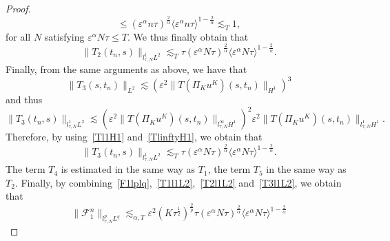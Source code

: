 \documentclass[10pt,a4paper]{article}
\begin{document}
\begin{proof}
\begin{equation}
      \leq {(\varepsilon^\alpha n\tau)}^\frac2\alpha {\langle\varepsilon^\alpha n\tau\rangle}^{1-\frac2\alpha} 
      \lesssim_T 1,
    \end{equation}
    for all \(N\) satisfying \( \varepsilon^\alpha N\tau \leq T \).
    We thus finally obtain that 
    \begin{equation}\label{T2l1L2}
      \|T_2(t_n,s)\|_{l^1_{\tau,N}L^2} \lesssim_T \tau 
      {(\varepsilon^\alpha N\tau)}^\frac2\alpha {\langle\varepsilon^\alpha N\tau\rangle}^{1-\frac2\alpha}.
    \end{equation}
    Finally, from the same arguments as above, we have that 
    \[ \|T_3(s,t_n)\|_{L^2}  \lesssim \left(\varepsilon^2\|T(\Pi_K u^K)(s, t_n) \|_{H^1}\right)^3 \]
    and thus 
    \[ \|T_3(t_n,s)\|_{l^1_{\tau,N}L^2} \lesssim \left(\varepsilon^2 
    \|T(\Pi_K u^K)(s,t_n)\|_{l^\infty_{\tau,N}H^1}\right)^2 \varepsilon^2 
    \|T(\Pi_K u^K)(s,t_n)\|_{l^1_{\tau,N}H^1}. \]
    Therefore, by using~\eqref{Tl1H1} and~\eqref{TlinftyH1}, we obtain that 
    \begin{equation}\label{T3l1L2}
      \|T_3(t_n,s)\|_{l^1_{\tau,N}L^2} \lesssim_T \tau 
      {(\varepsilon^\alpha N\tau)}^\frac2\alpha {\langle\varepsilon^\alpha N\tau\rangle}^{1-\frac2\alpha}.
    \end{equation}
    The term \(T_4\) is estimated in the same way as \(T_1\), the term \(T_5\)
    in the same way as \(T_2\). Finally, by combining~\eqref{F1lplq},~\eqref{T1l1L2},~\eqref{T2l1L2} 
    and~\eqref{T3l1L2}, we obtain that 
    \[ \| \mathcal F_1^n \|_{l^p_{\tau,N}L^q} \lesssim_{\alpha,T}
    \varepsilon^2 (K\tau^\frac12)^\frac2p \tau 
    {(\varepsilon^\alpha N\tau)}^\frac2\alpha {\langle\varepsilon^\alpha N\tau\rangle}^{1-\frac2\alpha}
    \]
  \end{proof}
\end{document}
